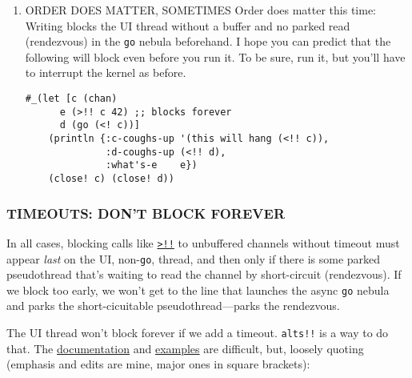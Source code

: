 \documentclass[10pt,oneside,x11names]{article}
\begin{document}
\begin{enumerate}
StackOverflow reveals a way to find out whether a channel is closed by
peeking under the covers (\url{https://stackoverflow.com/questions/24912971}):

\begin{verbatim}
(let [c (chan) ;; NO BUFFER!
      d (go (<! c)) ;; park a pseudothread to read c
      e (>!! c 42)  ;; blocking write unparks c's pseudothread
      f (clojure.core.async.impl.protocols/closed? c)]
    (println {:c-coughs-up '(hangs (<!! c)),
              :d-coughs-up (<!! d),
              :c-is-open-at-e?  e,
              :c-is-open-at-f?  f})
    (close! c) (close! d))
\end{verbatim}

\item ORDER DOES MATTER, SOMETIMES
\label{order-does-matter-sometimes}
Order does matter this time: Writing blocks the UI thread without a
buffer and no parked read (rendezvous) in the \texttt{go} nebula beforehand. I
hope you can predict that the following will block even before you run
it. To be sure, run it, but you'll have to interrupt the kernel as
before.

\begin{verbatim}
#_(let [c (chan)
      e (>!! c 42) ;; blocks forever
      d (go (<! c))]
    (println {:c-coughs-up '(this will hang (<!! c)),
              :d-coughs-up (<!! d),
              :what's-e    e})
    (close! c) (close! d))
\end{verbatim}
\end{enumerate}

\subsubsection{TIMEOUTS: DON'T BLOCK FOREVER}
\label{timeouts-dont-block-forever}
In all cases, blocking calls like
\href{https://clojuredocs.org/clojure.core.async/>!!}{\texttt{>!!}} to
unbuffered channels without timeout must appear \emph{last} on the UI,
non-\texttt{go}, thread, and then only if there is some parked pseudothread
that's waiting to read the channel by short-circuit (rendezvous). If we
block too early, we won't get to the line that launches the async \texttt{go}
nebula and parks the short-cicuitable pseudothread---parks the
rendezvous.

The UI thread won't block forever if we add a timeout. \texttt{alts!!} is a way to do
that. The \href{https://clojuredocs.org/clojure.core.async/alts!!}{documentation} and \href{https://clojuredocs.org/clojure.core.async/alts!!}{examples} are difficult, but, loosely quoting
(emphasis and edits are mine, major ones in square brackets):
\end{document}
